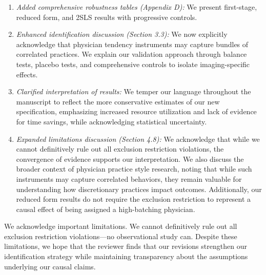 \documentclass[11pt]{article}
\newcommand{\1}{\hbox{\rm 1\kern-.35em 1}}
\begin{document}
\begin{enumerate}
\item \textit{Added comprehensive robustness tables (Appendix D):} We present first-stage, reduced form, and 2SLS results with progressive controls.
\item \textit{Enhanced identification discussion (Section 3.3):} We now explicitly acknowledge that physician tendency instruments may capture bundles of correlated practices. We explain our validation approach through balance tests, placebo tests, and comprehensive controls to isolate imaging-specific effects.
\item \textit{Clarified interpretation of results:} We temper our language throughout the manuscript to reflect the more conservative estimates of our new specification, emphasizing increased resource utilization and lack of evidence for time savings, while acknowledging statistical uncertainty.
\item \textit{Expanded limitations discussion (Section 4.8):} We acknowledge that while we cannot definitively rule out all exclusion restriction violations, the convergence of evidence supports our interpretation. We also discuss the broader context of physician practice style research, noting that while such instruments may capture correlated behaviors, they remain valuable for understanding how discretionary practices impact outcomes. Additionally, our reduced form results do not require the exclusion restriction to represent a causal effect of being assigned a high-batching physician.
\end{enumerate}

We acknowledge important limitations. We cannot definitively rule out all exclusion restriction violations—no observational study can. Despite these limitations, we hope that the reviewer finds that our revisions strengthen our identification strategy while maintaining transparency about the assumptions underlying our causal claims.

\color{black}
\end{document}
